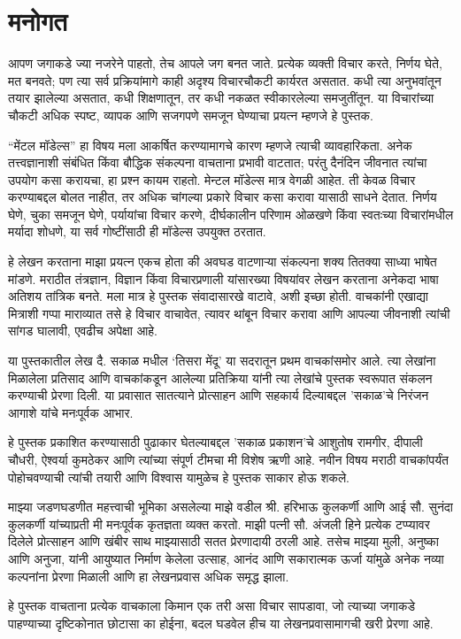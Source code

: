 
\chapter*{मनोगत}
आपण जगाकडे ज्या नजरेने पाहतो, तेच आपले जग बनत जाते. प्रत्येक व्यक्ती विचार करते, निर्णय घेते, मत बनवते; पण त्या सर्व प्रक्रियांमागे काही अदृश्य विचारचौकटी कार्यरत असतात. कधी त्या अनुभवांतून तयार झालेल्या असतात, कधी शिक्षणातून, तर कधी नकळत स्वीकारलेल्या समजुतींतून. या विचारांच्या चौकटी अधिक स्पष्ट, व्यापक आणि सजगपणे समजून घेण्याचा प्रयत्न म्हणजे हे पुस्तक.

“मेंटल मॉडेल्स” हा विषय मला आकर्षित करण्यामागचे कारण म्हणजे त्याची व्यावहारिकता. अनेक तत्त्वज्ञानाशी संबंधित किंवा बौद्धिक संकल्पना वाचताना प्रभावी वाटतात; परंतु दैनंदिन जीवनात त्यांचा उपयोग कसा करायचा, हा प्रश्न कायम राहतो. मेन्टल मॉडेल्स मात्र वेगळी आहेत. ती केवळ विचार करण्याबद्दल बोलत नाहीत, तर अधिक चांगल्या प्रकारे विचार कसा करावा यासाठी साधने देतात. निर्णय घेणे, चुका समजून घेणे, पर्यायांचा विचार करणे, दीर्घकालीन परिणाम ओळखणे किंवा स्वतःच्या विचारांमधील मर्यादा शोधणे, या सर्व गोष्टींसाठी ही मॉडेल्स उपयुक्त ठरतात.

हे लेखन करताना माझा प्रयत्न एकच होता की अवघड वाटणाऱ्या संकल्पना शक्य तितक्या साध्या भाषेत मांडणे. मराठीत तंत्रज्ञान, विज्ञान किंवा विचारप्रणाली यांसारख्या विषयांवर लेखन करताना अनेकदा भाषा अतिशय तांत्रिक बनते. मला मात्र हे पुस्तक संवादासारखे वाटावे, अशी इच्छा होती. वाचकांनी एखाद्या मित्राशी गप्पा माराव्यात तसे हे विचार वाचावेत, त्यावर थांबून विचार करावा आणि आपल्या जीवनाशी त्यांची सांगड घालावी, एवढीच अपेक्षा आहे.

या पुस्तकातील लेख दै. सकाळ मधील ‘तिसरा मेंदू’ या सदरातून प्रथम वाचकांसमोर आले. त्या लेखांना मिळालेला प्रतिसाद आणि वाचकांकडून आलेल्या प्रतिक्रिया यांनी त्या लेखांचे पुस्तक स्वरूपात संकलन करण्याची प्रेरणा दिली. या प्रवासात सातत्याने प्रोत्साहन आणि सहकार्य दिल्याबद्दल 'सकाळ'चे निरंजन आगाशे यांचे मनःपूर्वक आभार.

हे पुस्तक प्रकाशित करण्यासाठी पुढाकार घेतल्याबद्दल 'सकाळ प्रकाशन'चे आशुतोष रामगीर, दीपाली चौधरी, ऐश्वर्या कुमठेकर आणि त्यांच्या संपूर्ण टीमचा मी विशेष ऋणी आहे. नवीन विषय मराठी वाचकांपर्यंत पोहोचवण्याची त्यांची तयारी आणि विश्वास यामुळेच हे पुस्तक साकार होऊ शकले.

माझ्या जडणघडणीत महत्त्वाची भूमिका असलेल्या माझे वडील श्री. हरिभाऊ कुलकर्णी आणि आई सौ. सुनंदा कुलकर्णी यांच्याप्रती मी मनःपूर्वक कृतज्ञता व्यक्त करतो. माझी पत्नी सौ. अंजली हिने प्रत्येक टप्प्यावर दिलेले प्रोत्साहन आणि खंबीर साथ माझ्यासाठी सतत प्रेरणादायी ठरली आहे. तसेच माझ्या मुली, अनुष्का आणि अनुजा, यांनी आयुष्यात निर्माण केलेला उत्साह, आनंद आणि सकारात्मक ऊर्जा यांमुळे अनेक नव्या कल्पनांना प्रेरणा मिळाली आणि हा लेखनप्रवास अधिक समृद्ध झाला.

हे पुस्तक वाचताना प्रत्येक वाचकाला किमान एक तरी असा विचार सापडावा, जो त्याच्या जगाकडे पाहण्याच्या दृष्टिकोनात छोटासा का होईना, बदल घडवेल हीच या लेखनप्रवासामागची खरी प्रेरणा आहे.


